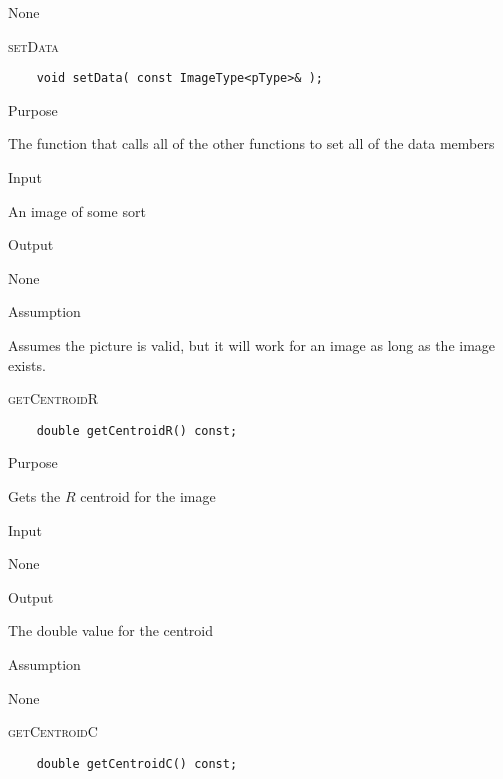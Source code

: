 \documentclass[pdftex, 11pt]{article}
\begin{document}
\begin{description}
\begin{description}
				None

		\end{description}

	\item{\textsc{setData}}
		\begin{description}
\begin{lstlisting}
	void setData( const ImageType<pType>& );
\end{lstlisting}

			\item{Purpose}

				The function that calls all of the other functions to set all of the data members

			\item{Input}

				An image of some sort

			\item{Output}

				None

			\item{Assumption}

				Assumes the picture is valid, but it will work for an image as long as the image exists.

		\end{description}

	\item{\textsc{getCentroidR}}
		\begin{description}
\begin{lstlisting}
	double getCentroidR() const;
\end{lstlisting}

			\item{Purpose}

				Gets the $R$ centroid for the image

			\item{Input}

				None

			\item{Output}

				The double value for the centroid

			\item{Assumption}

				None

		\end{description}

	\item{\textsc{getCentroidC}}
		\begin{description}
\begin{lstlisting}
	double getCentroidC() const;
\end{lstlisting}


\end{description}
\end{description}
\end{document}
